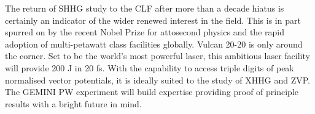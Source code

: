The return of SHHG study to the CLF after more than a decade hiatus is certainly an indicator of the wider renewed interest in the field. This is in part spurred on by the recent Nobel Prize for attosecond physics and the rapid adoption of multi-petawatt class facilities globally. Vulcan 20-20 is only around the corner. Set to be the world's most powerful laser, this ambitious laser facility will provide 200 J in 20 fs. With the capability to access triple digits of peak normalised vector potentials, it is ideally suited to the study of XHHG and ZVP. The GEMINI PW experiment will build expertise providing proof of principle results with a bright future in mind.
